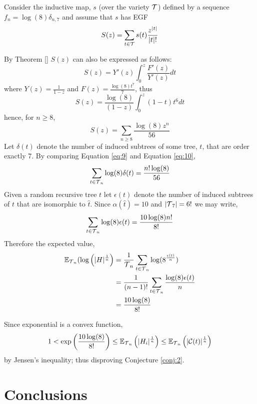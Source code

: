 Consider the inductive map, $s$  (over the variety $\operatorname{\mathcal{T}}$) defined by a sequence $f_n = \log(8)\delta_{n,7}$ and assume that $s$ has EGF
\begin{equation}\label{eq:9}
  S(z) = \sum_{t \in \operatorname{\mathcal{T}}} s(t)\frac{z^{\lvert t \rvert}}{\lvert t \rvert !}
\end{equation}


By Theorem \ref{} $S(z)$ can also be expressed as follows:
\[
 S(z) = Y'(z) \int_0^z \frac{F'(z)}{Y'(z)} dt
\]
where $Y(z) = \frac{1}{1-z}$ and $F(z) = \frac{\log(8)t^7}{7}$, thus
\[
 S(z) = \frac{\log(8)}{(1-z)}\int_0^z(1-t)t^6 dt
\]
hence, for $n \geq 8$,
\begin{equation}\label{eq:10}
 S(z) = \sum_{n \geq 8} \frac{\log(8)z^n}{56}
\end{equation}
Let $\delta(t)$ denote the number of induced subtrees of some tree, $t$, that are order exactly 7.  By comparing Equation \ref{eq:9} and Equation \ref{eq:10},
\[
 \sum_{t \in \operatorname{\mathcal{T}}_n}\log(8)\delta(t) = \frac{n!\log(8)}{56}
\]
Given a random recursive tree $t$ let $\epsilon(t)$ denote the number of induced subtrees of $t$ that are isomorphic to $\hat{t}$. Since $\alpha(\hat{t}) = 10$ and $\lvert \operatorname{\mathcal{T}}_7 \rvert = 6!$ we may write,
\[
 \sum_{t \in \operatorname{\mathcal{T}}_n}\log(8)\epsilon(t) = \frac{10\log(8)n!}{8!}
\]
Therefore the expected value, 
\begin{align}
 \mathbb{E}_{\operatorname{\mathcal{T}}_n}(\log\left(\lvert H \rvert^{\frac{1}{n}}\right) &= \frac{1}{\operatorname{\mathcal{T}}_n}\sum_{t \in \operatorname{\mathcal{T}}_n} \log(8^{\frac{\epsilon(t)}{n}}) \\
 &= \frac{1}{(n-1)!}\sum_{t \in \operatorname{\mathcal{T}}_n} \frac{\log(8)\epsilon(t)}{n} \\
 &= \frac{10\log(8)}{8!}
\end{align}

Since exponential is a convex function,
\[
 1 < \exp\left( \frac{10\log(8)}{8!}\right) \leq \mathbb{E}_{\operatorname{\mathcal{T}}_n}\left( \lvert H_i \rvert^{\frac{1}{n}}\right) \leq \mathbb{E}_{\operatorname{\mathcal{T}}_n} \left( \lvert \mathcal{C}(t) \rvert^{\frac{1}{n}}   \right)
\]
by Jensen's inequality; thus disproving Conjecture \ref{conj:2}.  
\section{Conclusions}\label{sec:conc}





